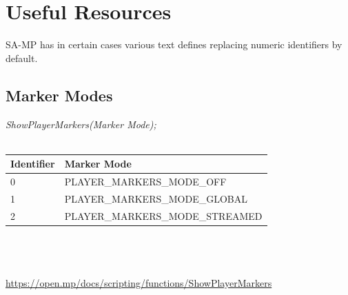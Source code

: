 \documentclass{article}
\begin{document}
\newpage
\section{Useful Resources}
SA-MP has in certain cases various text defines replacing numeric identifiers by default.

\subsection{Marker Modes}
\textit{ShowPlayerMarkers(Marker Mode);}
\\
\\
\begin{tabular}{ |l|l| } 
\hline
Identifier & Marker Mode \\
\hline
0 & PLAYER\_MARKERS\_MODE\_OFF \\ 
1 & PLAYER\_MARKERS\_MODE\_GLOBAL \\ 
2 & PLAYER\_MARKERS\_MODE\_STREAMED \\
\hline
\end{tabular}
\\\\
\\\url{https://open.mp/docs/scripting/functions/ShowPlayerMarkers}
\end{document}
